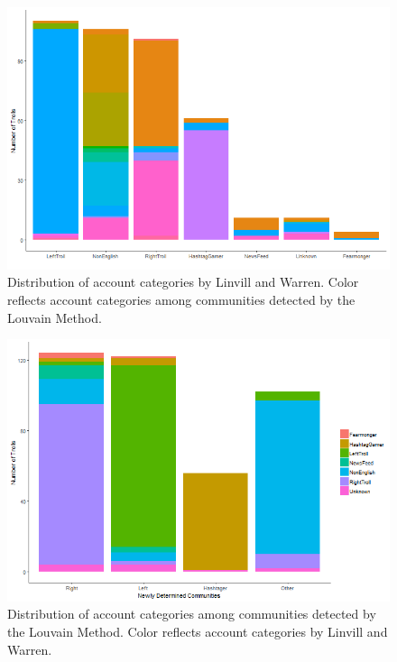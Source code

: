 \documentclass[12pt, titlepage=true, toc=bib]{scrartcl}
\begin{document}
\begin{figure}[!ht]
\centering
\includegraphics[width=0.95\linewidth]{final_figure1.png}%
\caption[Distribution of account categories in communities]{Distribution of account categories by Linvill and Warren. Color reflects account categories among communities detected by the Louvain Method.}
\label{fig:distcom}
\end{figure}

\begin{figure}[!ht]
\centering
\includegraphics[width=0.95\linewidth]{final_figure2.png}%
\caption[Distribution of communities in account categories]{Distribution of account categories among communities detected by the Louvain Method. Color reflects account categories by Linvill and Warren.}
\label{fig:distcat}
\end{figure}
\end{document}
